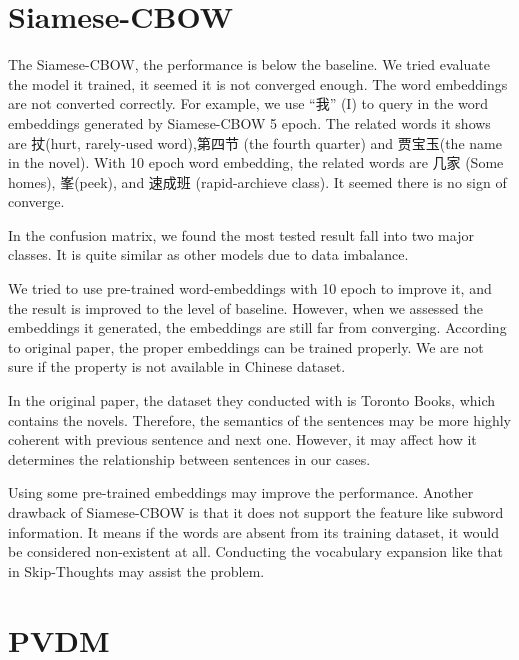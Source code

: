 \section{Siamese-CBOW}

\begin{CJK}{UTF8}{gbsn}
The Siamese-CBOW, the performance is below the baseline. We tried evaluate the model it trained, it seemed it is not converged enough. 
The word embeddings are not converted correctly. For example, we use \enquote{我} (I) to query in the word embeddings generated by Siamese-CBOW 5 epoch. 
The related words it shows are 扙(hurt, rarely-used word),第四节 (the fourth quarter) and 贾宝玉(the name in the novel). 
With 10 epoch word embedding, the related words are 几家 (Some homes), 峯(peek), and 速成班 (rapid-archieve class). It seemed there is no sign of converge.
\end{CJK}

In the confusion matrix, we found the most tested result fall into two major classes.
It is quite similar as other models due to data imbalance.

We tried to use pre-trained word-embeddings with 10 epoch to improve it, and the result is improved to the level of baseline.
However, when we assessed the embeddings it generated, the embeddings are still far from converging. 
According to original paper, the proper embeddings can be trained properly. 
We are not sure if the property is not available in Chinese dataset.

In the original paper, the dataset they conducted with is Toronto Books, which contains the novels.
Therefore, the semantics of the sentences may be more highly coherent with previous sentence and next one. 
However, it may affect how it determines the relationship between sentences in our cases.

Using some pre-trained embeddings may improve the performance. 
Another drawback of Siamese-CBOW is that it does not support the feature like subword information.
It means if the words are absent from its training dataset, it would be considered non-existent at all. Conducting the vocabulary expansion like that in Skip-Thoughts may assist the problem.


\section{PVDM}

